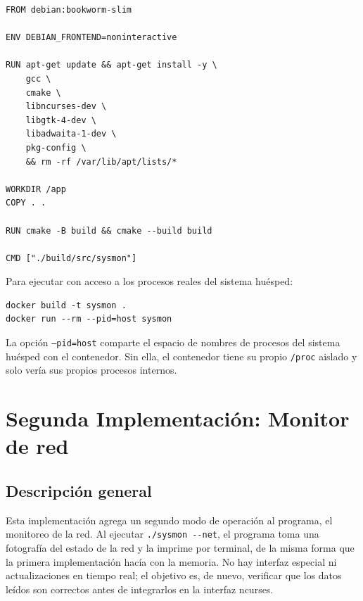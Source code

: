 \documentclass[12pt,letterpaper]{article}
\begin{document}
\begin{lstlisting}[style=moddocker, caption={Dockerfile}]
FROM debian:bookworm-slim

ENV DEBIAN_FRONTEND=noninteractive

RUN apt-get update && apt-get install -y \
    gcc \
    cmake \
    libncurses-dev \
    libgtk-4-dev \
    libadwaita-1-dev \
    pkg-config \
    && rm -rf /var/lib/apt/lists/*

WORKDIR /app
COPY . .

RUN cmake -B build && cmake --build build

CMD ["./build/src/sysmon"]
\end{lstlisting}

\medskip

Para ejecutar con acceso a los procesos reales del sistema huésped:

\begin{Verbatim}[frame=single, rulecolor=\color{black!20}, fontsize=\small]
docker build -t sysmon .
docker run --rm --pid=host sysmon
\end{Verbatim}

La opción \texttt{--pid=host} comparte el espacio de nombres de procesos del sistema huésped con el contenedor.
Sin ella, el contenedor tiene su propio \texttt{/proc} aislado y solo vería sus propios procesos internos.


\newpage


\section*{Segunda Implementación: Monitor de red}

\subsection*{Descripción general}

Esta implementación agrega un segundo modo de operación al programa, el monitoreo de la red. Al ejecutar
\texttt{./sysmon -{}-net}, el programa toma una fotografía del estado de la red y la imprime por terminal,
de la misma forma que la primera implementación hacía con la memoria. No hay interfaz especial ni actualizaciones
en tiempo real; el objetivo es, de nuevo, verificar que los datos leídos son correctos antes de integrarlos en
la interfaz ncurses.
\end{document}

